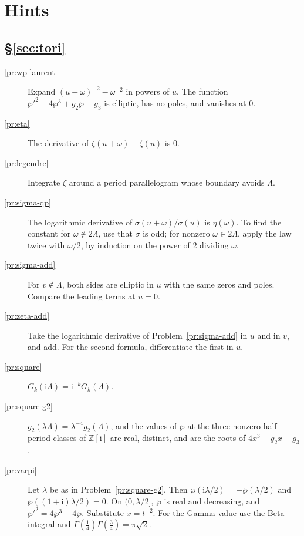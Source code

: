 \documentclass[reqno]{amsart}
\theoremstyle{definition}
\theoremstyle{plain}
\newcommand{\Z}{\mathbb{Z}}
\newcommand{\ii}{\mathrm{i}}
\begin{document}
\section*{Hints}

\subsection*{\S\ref{sec:tori}}
\begin{description}
\item[\ref{pr:wp-laurent}] Expand \((u - \omega)^{-2} - \omega^{-2}\) in powers of \(u\).  The function \(\wp'^2 - 4\wp^3 + g_2\wp + g_3\) is elliptic, has no poles, and vanishes at \(0\).
\item[\ref{pr:eta}] The derivative of \(\zeta(u+\omega) - \zeta(u)\) is \(0\).
\item[\ref{pr:legendre}] Integrate \(\zeta\) around a period parallelogram whose boundary avoids \(\Lambda\).
\item[\ref{pr:sigma-qp}] The logarithmic derivative of \(\sigma(u+\omega)/\sigma(u)\) is \(\eta(\omega)\).  To find the constant for \(\omega \notin 2\Lambda\), use that \(\sigma\) is odd; for nonzero \(\omega \in 2\Lambda\), apply the law twice with \(\omega/2\), by induction on the power of \(2\) dividing \(\omega\).
\item[\ref{pr:sigma-add}] For \(v\notin\Lambda\), both sides are elliptic in \(u\) with the same zeros and poles.  Compare the leading terms at \(u = 0\).
\item[\ref{pr:zeta-add}] Take the logarithmic derivative of Problem~\ref{pr:sigma-add} in \(u\) and in \(v\), and add.  For the second formula, differentiate the first in \(u\).
\item[\ref{pr:square}] \(G_k(\ii\Lambda) = \ii^{-k} G_k(\Lambda)\).
\item[\ref{pr:square-g2}] \(g_2(\lambda\Lambda) = \lambda^{-4} g_2(\Lambda)\), and the values of \(\wp\) at the three nonzero half-period classes of \(\Z[\ii]\) are real, distinct, and are the roots of \(4x^3 - g_2 x - g_3\).
\item[\ref{pr:varpi}] Let \(\lambda\) be as in Problem~\ref{pr:square-g2}.  Then \(\wp(\ii\lambda/2) = -\wp(\lambda/2)\) and \(\wp((1+\ii)\lambda/2) = 0\).  On \((0, \lambda/2]\), \(\wp\) is real and decreasing, and \(\wp'^2 = 4\wp^3 - 4\wp\).  Substitute \(x = t^{-2}\).  For the Gamma value use the Beta integral and \(\Gamma(\tfrac14)\Gamma(\tfrac34) = \pi\sqrt2\).
\end{description}
\end{document}
